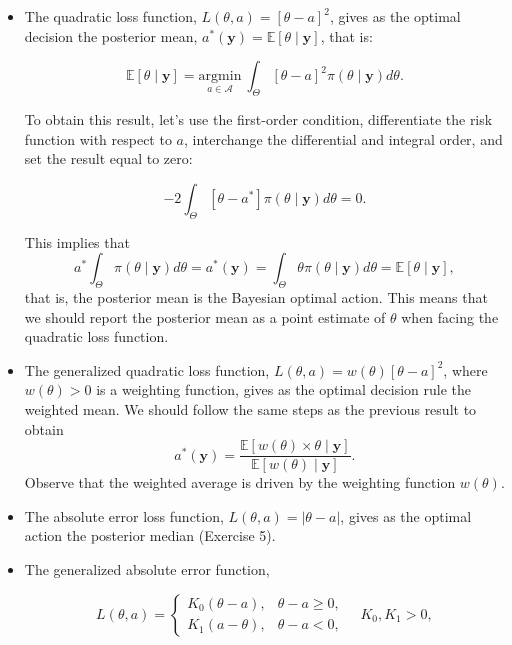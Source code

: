\begin{itemize}
	\item The quadratic loss function, $L({\theta},a)=[{\theta}-a]^2$, gives as the optimal decision the posterior mean, $a^*(\mathbf{y})=\mathbb{E}[{\theta}\mid \mathbf{y}]$, that is:
	
	\begin{equation*}
		\mathbb{E}[{\theta}\mid \mathbf{y}] = \underset{a \in \mathcal{A}}{\mathrm{argmin}} \  \int_{{\Theta}} [{\theta}-a]^2\pi({\theta}\mid \mathbf{y})d{\theta}.
	\end{equation*}
	
	To obtain this result, let's use the first-order condition, differentiate the risk function with respect to $a$, interchange the differential and integral order, and set the result equal to zero:
	
	\[
	-2\int_{{\Theta}} [{\theta}-a^*]\pi({\theta}\mid \mathbf{y})d{\theta}=0.
	\]
	
	This implies that
	\[
	a^*\int_{{\Theta}} \pi({\theta}\mid \mathbf{y})d{\theta}=a^*(\mathbf{y})=\int_{{\Theta}} {\theta}\pi({\theta}\mid \mathbf{y})d{\theta}=\mathbb{E}[{\theta}\mid \mathbf{y}],
	\]
	that is, the posterior mean is the Bayesian optimal action. This means that we should report the posterior mean as a point estimate of $\theta$ when facing the quadratic loss function.
	
	\item The generalized quadratic loss function, $L({\theta},a)=w({\theta})[{\theta}-a]^2$, where $w({\theta})>0$ is a weighting function, gives as the optimal decision rule the weighted mean. We should follow the same steps as the previous result to obtain
	\[
	a^*(\mathbf{y})=\frac{\mathbb{E}[w({\theta})\times{\theta}\mid \mathbf{y}]}{\mathbb{E}[w({\theta})\mid \mathbf{y}]}.
	\]
	Observe that the weighted average is driven by the weighting function $w({\theta})$.
	
	\item The absolute error loss function, $L({\theta},a)=|{\theta}-a|$, gives as the optimal action the posterior median (Exercise 5).
	
	\item The generalized absolute error function,
	
	\begin{equation*}
		L(\theta,a)=\begin{cases} 
			K_0(\theta-a), & \theta-a \geq 0, \\
			K_1(a-\theta), & \theta-a < 0, 
		\end{cases} \quad K_0, K_1 > 0,
	\end{equation*}
	

\end{itemize}
